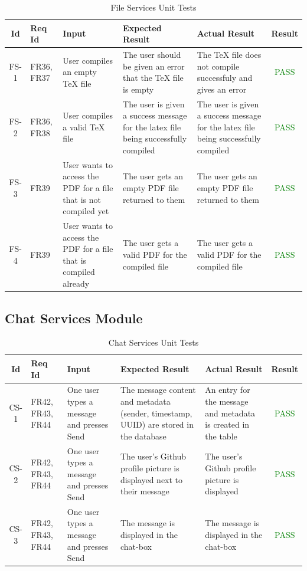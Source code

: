 \documentclass[12pt, titlepage]{article}
\begin{document}
	\begin{center}
		\begin{longtable}{|c|p{1cm}|p{2.7cm}|p{3cm}|p{3cm}|c|}
			\caption{File Services Unit Tests \label{long}}\\
			\hline
			\textbf{Id} & \textbf{Req Id} & \textbf{Input} & \textbf{Expected Result} & \textbf{Actual Result} & \textbf{Result}   \\
			\hline
			FS-1 & FR36, FR37 & User compiles an empty TeX file & The user should be given an error that the TeX file is empty & The TeX file does not compile successfuly and gives an error &  \textcolor{green}{PASS} \\
			\hline
			FS-2 & FR36, FR38 & User compiles a valid TeX file & The user is given a success message for the latex file being successfully compiled & The user is given a success message for the latex file being successfully compiled &  \textcolor{green}{PASS} \\
			\hline
			FS-3 & FR39 & User wants to access the PDF for a file that is not compiled yet & The user gets an empty PDF file returned to them & The user gets an empty PDF file returned to them &  \textcolor{green}{PASS} \\
			\hline
			FS-4 & FR39 &  User wants to access the PDF for a file that is compiled already & The user gets a valid PDF for the compiled file & The user gets a valid PDF for the compiled file &  \textcolor{green}{PASS} \\
			\hline
		\end{longtable}
	\end{center}
	
	\subsection{Chat Services Module}
	
	\begin{center}
		\begin{longtable}{|c|p{1cm}|p{2.7cm}|p{3cm}|p{3cm}|c|}
			\caption{Chat Services Unit Tests \label{long}}\\
			\hline
			\textbf{Id} & \textbf{Req Id} & \textbf{Input} & \textbf{Expected Result} & \textbf{Actual Result} & \textbf{Result}   \\
			\hline
			CS-1 & FR42, FR43, FR44 & One user types a message and presses Send & The message content and metadata (sender, timestamp, UUID) are stored in the database & An entry for the message and metadata is created in the table  &  \textcolor{green}{PASS} \\
			\hline
			CS-2 & FR42, FR43, FR44 & One user types a message and presses Send & The user's Github profile picture is displayed next to their message & The user's Github profile picture is displayed &  \textcolor{green}{PASS} \\
			\hline
			CS-3 & FR42, FR43, FR44 & One user types a message and presses Send &  The message is displayed in the chat-box & The message is displayed in the chat-box &  \textcolor{green}{PASS} \\
			\hline
		\end{longtable}
	\end{center}
	
\end{document}
